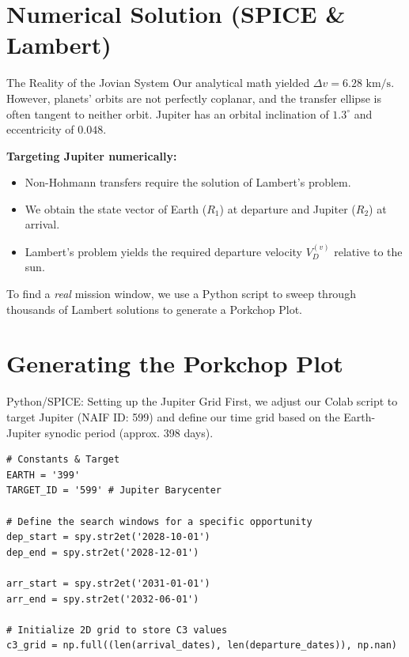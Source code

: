 \documentclass[11pt]{beamer}
\begin{document}
\section{Numerical Solution (SPICE \& Lambert)}

\begin{frame}{The Reality of the Jovian System}
    Our analytical math yielded $\Delta v = 6.28 \text{ km/s}$. However, planets' orbits are not perfectly coplanar, and the transfer ellipse is often tangent to neither orbit. Jupiter has an orbital inclination of $1.3^\circ$ and eccentricity of $0.048$.
    
    \vspace{0.2cm}
    \textbf{Targeting Jupiter numerically:}
    \begin{itemize}
        \item Non-Hohmann transfers require the solution of Lambert's problem.
        \item We obtain the state vector of Earth ($R_1$) at departure and Jupiter ($R_2$) at arrival.
        \item Lambert's problem yields the required departure velocity $V_{D}^{(v)}$ relative to the sun.
    \end{itemize}
    
    \vspace{0.2cm}
    To find a \textit{real} mission window, we use a Python script to sweep through thousands of Lambert solutions to generate a Porkchop Plot.
\end{frame}

\section{Generating the Porkchop Plot}

\begin{frame}[fragile]{Python/SPICE: Setting up the Jupiter Grid}
    First, we adjust our Colab script to target Jupiter (NAIF ID: 599) and define our time grid based on the Earth-Jupiter synodic period (approx. 398 days).
    
\begin{lstlisting}
# Constants & Target
EARTH = '399'
TARGET_ID = '599' # Jupiter Barycenter

# Define the search windows for a specific opportunity
dep_start = spy.str2et('2028-10-01')
dep_end = spy.str2et('2028-12-01')

arr_start = spy.str2et('2031-01-01')
arr_end = spy.str2et('2032-06-01')

# Initialize 2D grid to store C3 values
c3_grid = np.full((len(arrival_dates), len(departure_dates)), np.nan)
\end{lstlisting}
\end{frame}
\end{document}
